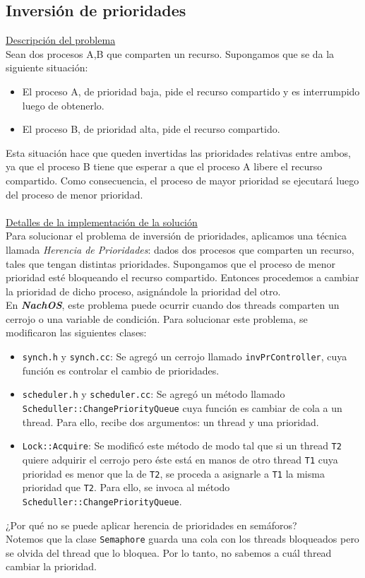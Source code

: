 \subsection*{Inversión de prioridades}
\textsf{\underline{Descripción del problema}}\\
Sean dos procesos A,B que comparten un recurso. Supongamos que se da la siguiente situación:
\begin{itemize}
    \item El proceso A, de prioridad baja, pide el recurso compartido y es interrumpido luego de obtenerlo.
    \item El proceso B, de prioridad alta, pide el recurso compartido.
\end{itemize}
Esta situación hace que queden invertidas las prioridades relativas entre ambos, ya que el proceso B tiene que esperar a que el proceso A libere el recurso compartido. Como consecuencia, el proceso de mayor prioridad se ejecutará luego del proceso de menor prioridad.\\
\\\textsf{\underline{Detalles de la implementación de la solución}}\\
Para solucionar el problema de inversión de prioridades, aplicamos una técnica llamada \emph{Herencia de Prioridades}: dados dos procesos que comparten un recurso, tales que tengan distintas prioridades. Supongamos que el proceso de menor prioridad esté bloqueando el recurso compartido. Entonces procedemos a cambiar la prioridad de dicho proceso, asignándole la prioridad del otro.\\
En \textbf{\textit{NachOS}}, este problema puede ocurrir cuando dos threads comparten un cerrojo o una variable de condición. Para solucionar este problema, se modificaron las siguientes clases:
\begin{itemize}
    \item \texttt{synch.h} y \texttt{synch.cc}: Se agregó un cerrojo llamado \texttt{invPrController}, cuya función es controlar el cambio de prioridades.
    \item \texttt{scheduler.h} y \texttt{scheduler.cc}: Se agregó un método llamado \texttt{Scheduller::ChangePriorityQueue} cuya función es cambiar de cola a un thread. Para ello, recibe dos argumentos: un thread y una prioridad.
    \item \texttt{Lock::Acquire}: Se modificó este método de modo tal que si un thread \texttt{T2} quiere adquirir el cerrojo pero éste está en manos de otro thread \texttt{T1} cuya prioridad es menor que la de \texttt{T2}, se proceda a asignarle a \texttt{T1} la misma prioridad que \texttt{T2}. Para ello, se invoca al método \texttt{Scheduller::ChangePriorityQueue}.
\end{itemize}
¿Por qué no se puede aplicar herencia de prioridades en semáforos?\\
Notemos que la clase \texttt{Semaphore} guarda una cola con los threads bloqueados pero se olvida del thread que lo bloquea. Por lo tanto, no sabemos a cuál thread cambiar la prioridad.